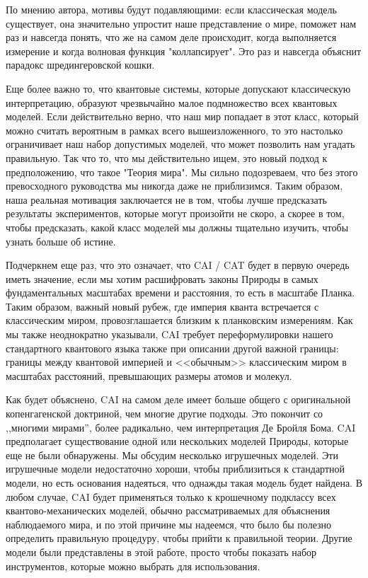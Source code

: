 \documentclass[main.tex]{subfiles}
\begin{document}
По мнению автора, мотивы будут подавляющими: если классическая модель существует, она значительно упростит наше представление о мире, поможет нам раз и навсегда понять, что же на самом деле происходит, когда выполняется измерение и когда волновая функция "коллапсирует". Это раз и навсегда объяснит парадокс шредингеровской кошки.

Еще более важно то, что квантовые системы, которые допускают классическую интерпретацию, образуют чрезвычайно малое подмножество всех квантовых моделей. Если действительно верно, что наш мир попадает в этот класс, который можно считать вероятным в рамках всего вышеизложенного, то это настолько ограничивает наш набор допустимых моделей, что может позволить нам угадать правильную. Так что то, что мы действительно ищем, это новый подход к предположению, что такое "Теория мира". Мы сильно подозреваем, что без этого превосходного руководства мы никогда даже не приблизимся. Таким образом, наша реальная мотивация заключается не в том, чтобы лучше предсказать результаты экспериментов, которые могут произойти не скоро, а скорее в том, чтобы предсказать, какой класс моделей мы должны тщательно изучить, чтобы узнать больше об истине.

Подчеркнем еще раз, что это означает, что CAI / CAT будет в первую очередь иметь значение, если мы хотим расшифровать законы Природы в самых фундаментальных масштабах времени и расстояния, то есть в масштабе Планка. Таким образом, важный новый рубеж, где империя кванта встречается с классическим миром, провозглашается близким к планковским измерениям. Как мы также неоднократно указывали, CAI требует переформулировки нашего стандартного квантового языка также при описании другой важной границы: границы между квантовой империей и <<обычным>> классическим миром в масштабах расстояний, превышающих размеры атомов и молекул.

Как будет объяснено, CAI на самом деле имеет больше общего с оригинальной копенгагенской доктриной, чем многие другие подходы. Это покончит со ,,многими мирами'', более радикально, чем интерпретация Де Бройля Бома. CAI предполагает существование одной или нескольких моделей Природы, которые еще не были обнаружены. Мы обсудим несколько игрушечных моделей. Эти игрушечные модели недостаточно хороши, чтобы приблизиться к стандартной модели, но есть основания надеяться, что однажды такая модель будет найдена. В любом случае, CAI будет применяться только к крошечному подклассу всех квантово-механических моделей, обычно рассматриваемых для объяснения наблюдаемого мира, и по этой причине мы надеемся, что было бы полезно определить правильную процедуру, чтобы прийти к правильной теории.
Другие модели были представлены в этой работе, просто чтобы показать набор инструментов, которые можно выбрать для использования.
\end{document}
